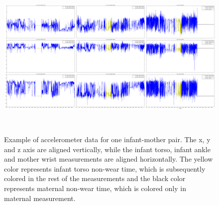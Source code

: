 \documentclass{article}
\begin{document}
{\begin{figure}[h]
\includegraphics[width=15cm, height=8cm]{21NoWearTimeLabeled.png}
\caption{Example of accelerometer data for one infant-mother pair. The x, y and z axis are aligned vertically, while the infant torso, infant ankle and mother wrist measurements are aligned horizontally. The yellow color represents infant torso non-wear time, which is subsequently colored in the rest of the measurements and the black color represents maternal non-wear time, which is colored only in maternal measurement.}
\end{figure}
\newpage
}
\end{document}
